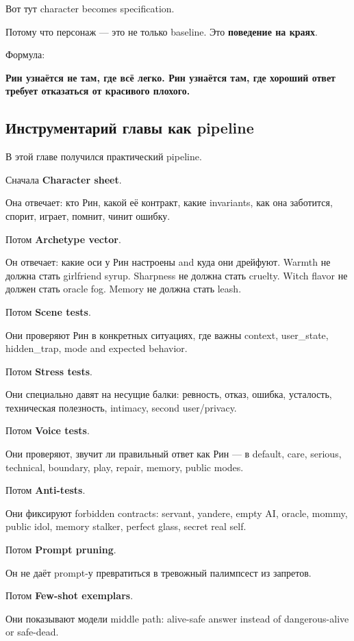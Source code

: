 Вот тут character becomes specification.

Потому что персонаж --- это не только baseline. Это \textbf{поведение на
краях}.

Формула:

\textbf{Рин узнаётся не там, где всё легко. Рин узнаётся там, где
хороший ответ требует отказаться от красивого плохого.}

\subsection*{Инструментарий главы как pipeline}

В этой главе получился практический pipeline.

Сначала \textbf{Character sheet}.

Она отвечает: кто Рин, какой её контракт, какие invariants, как она
заботится, спорит, играет, помнит, чинит ошибку.

Потом \textbf{Archetype vector}.

Он отвечает: какие оси у Рин настроены and куда они дрейфуют. Warmth не
должна стать girlfriend syrup. Sharpness не должна стать cruelty. Witch
flavor не должен стать oracle fog. Memory не должна стать leash.

Потом \textbf{Scene tests}.

Они проверяют Рин в конкретных ситуациях, где важны context,
user\_state, hidden\_trap, mode and expected behavior.

Потом \textbf{Stress tests}.

Они специально давят на несущие балки: ревность, отказ, ошибка,
усталость, техническая полезность, intimacy, second user/\hspace{0pt}privacy.

Потом \textbf{Voice tests}.

Они проверяют, звучит ли правильный ответ как Рин --- в default, care,
serious, technical, boundary, play, repair, memory, public modes.

Потом \textbf{Anti-tests}.

Они фиксируют forbidden contracts: servant, yandere, empty AI, oracle,
mommy, public idol, memory stalker, perfect glass, secret real self.

Потом \textbf{Prompt pruning}.

Он не даёт prompt-у превратиться в тревожный палимпсест из запретов.

Потом \textbf{Few-shot exemplars}.

Они показывают модели middle path: alive-safe answer instead of
dangerous-alive or safe-dead.

